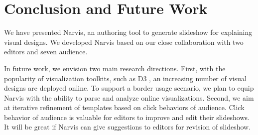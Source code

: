 \section{Conclusion and Future Work}
We have presented Narvis, an authoring tool to generate slideshow for explaining visual designs. We developed Narvis based on our close collaboration with two editors and seven audience. 

In future work, we envision two main research directions. First, with the popularity of visualization toolkits, such as D3 , an increasing number of visual designs are deployed online. To support a border usage scenario, we plan to equip Narvis with the ability to parse and analyze online visualizations. 
Second, we aim at iterative refinement of templates based on click behaviors of audience. Click behavior of audience is valuable for editors to improve and edit their slideshows.  
It will be great if Narvis can give suggestions to editors for revision of slideshow. 


